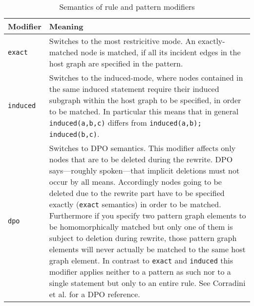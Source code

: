 \begin{table}[htbp]
    \begin{tabularx}{\linewidth}{l|X}
        \bf Modifier & \bf Meaning \\\hline
        \texttt{exact} & Switches to the most restricitive mode. An exactly-matched node is matched, if all its incident edges in the host graph are specified in the pattern.\\
        \texttt{induced} & Switches to the induced-mode, where nodes contained in the same induced statement require their induced subgraph within the host graph to be specified, in order to be matched. In particular this means that in general \texttt{induced(a,b,c)} differs from \texttt{induced(a,b); induced(b,c)}.\\
        \texttt{dpo} & Switches to DPO semantics. This modifier affects only nodes that are to be deleted during the rewrite. DPO says---roughly spoken---that implicit deletions must not occur by all means. Accordingly nodes going to be deleted due to the rewrite part have to be specified exactly (\texttt{exact} semantics) in order to be matched. Furthermore if you specify two pattern graph elements to be homomorphically matched but only one of them is subject to deletion during rewrite, those pattern graph elements will never actually be matched to the same host graph element. In contrast to \texttt{exact} and \texttt{induced} this modifier applies neither to a pattern as such nor to a single statement but only to an entire rule. See Corradini et al.\cite{dpoapproach} for a DPO reference.\\
    \end{tabularx}    
    \caption{Semantics of rule and pattern modifiers}
    \label{tbl:rules:modifiers}
\end{table}


